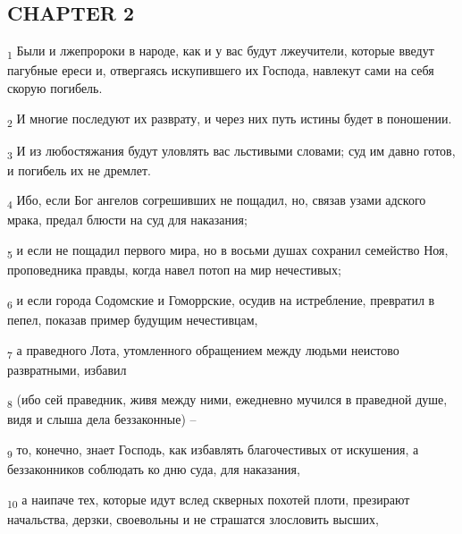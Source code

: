 \subsection{CHAPTER 2}
\begin{tcolorbox}
\textsubscript{1} Были и лжепророки в народе, как и у вас будут лжеучители, которые введут пагубные ереси и, отвергаясь искупившего их Господа, навлекут сами на себя скорую погибель.
\end{tcolorbox}
\begin{tcolorbox}
\textsubscript{2} И многие последуют их разврату, и через них путь истины будет в поношении.
\end{tcolorbox}
\begin{tcolorbox}
\textsubscript{3} И из любостяжания будут уловлять вас льстивыми словами; суд им давно готов, и погибель их не дремлет.
\end{tcolorbox}
\begin{tcolorbox}
\textsubscript{4} Ибо, если Бог ангелов согрешивших не пощадил, но, связав узами адского мрака, предал блюсти на суд для наказания;
\end{tcolorbox}
\begin{tcolorbox}
\textsubscript{5} и если не пощадил первого мира, но в восьми душах сохранил семейство Ноя, проповедника правды, когда навел потоп на мир нечестивых;
\end{tcolorbox}
\begin{tcolorbox}
\textsubscript{6} и если города Содомские и Гоморрские, осудив на истребление, превратил в пепел, показав пример будущим нечестивцам,
\end{tcolorbox}
\begin{tcolorbox}
\textsubscript{7} а праведного Лота, утомленного обращением между людьми неистово развратными, избавил
\end{tcolorbox}
\begin{tcolorbox}
\textsubscript{8} (ибо сей праведник, живя между ними, ежедневно мучился в праведной душе, видя и слыша дела беззаконные) --
\end{tcolorbox}
\begin{tcolorbox}
\textsubscript{9} то, конечно, знает Господь, как избавлять благочестивых от искушения, а беззаконников соблюдать ко дню суда, для наказания,
\end{tcolorbox}
\begin{tcolorbox}
\textsubscript{10} а наипаче тех, которые идут вслед скверных похотей плоти, презирают начальства, дерзки, своевольны и не страшатся злословить высших,
\end{tcolorbox}
